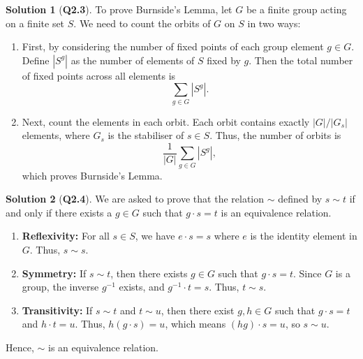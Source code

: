 \documentclass{article}
\theoremstyle{definition}
\newtheorem*{sol}{Solution}
\begin{document}
\begin{sol}[\textbf{Q2.3}]
	To prove Burnside's Lemma, let $G$ be a finite group acting on a finite set $S$. We need to count the orbits of $G$ on $S$ in two ways:
	\begin{enumerate}
		\item First, by considering the number of fixed points of each group element $g \in G$. Define $|S^g|$ as the number of elements of $S$ fixed by $g$. Then the total number of fixed points across all elements is
		      \begin{equation}
			      \sum_{g \in G} |S^g|.
		      \end{equation}
		\item Next, count the elements in each orbit. Each orbit contains exactly $|G|/|G_s|$ elements, where $G_s$ is the stabiliser of $s \in S$. Thus, the number of orbits is
		      \begin{equation}
			      \frac{1}{|G|} \sum_{g \in G} |S^g|,
		      \end{equation}
		      which proves Burnside's Lemma.
	\end{enumerate}
\end{sol}

\begin{sol}[\textbf{Q2.4}]
	We are asked to prove that the relation $\sim$ defined by $s \sim t$ if and only if there exists a $g \in G$ such that $g\cdot s = t$ is an equivalence relation.
	\begin{enumerate}
		\item \textbf{Reflexivity:} For all $s \in S$, we have $e\cdot s = s$ where $e$ is the identity element in $G$. Thus, $s \sim s$.
		\item \textbf{Symmetry:} If $s \sim t$, then there exists $g \in G$ such that $g\cdot s = t$. Since $G$ is a group, the inverse $g^{-1}$ exists, and $g^{-1}\cdot t = s$. Thus, $t \sim s$.
		\item \textbf{Transitivity:} If $s \sim t$ and $t \sim u$, then there exist $g, h \in G$ such that $g\cdot s = t$ and $h\cdot t = u$. Thus, $h(g\cdot s) = u$, which means $(hg)\cdot s = u$, so $s \sim u$.
	\end{enumerate}
	Hence, $\sim$ is an equivalence relation.
\end{sol}
\end{document}

